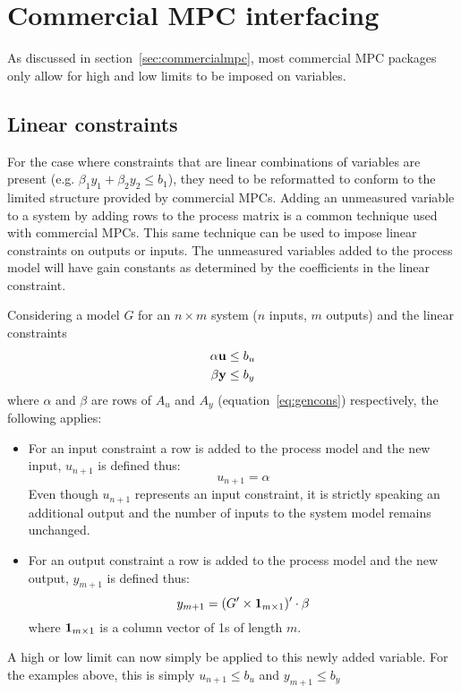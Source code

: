 \section{Commercial MPC interfacing}
As discussed in section~\ref{sec:commercialmpc}, most commercial MPC packages only allow for high and low limits to be imposed on variables.

\subsection{Linear constraints}\label{sec:lincons}
For the case where constraints that are linear combinations of variables are present (e.g. $\beta_1 y_1+\beta_2 y_2\leq b_1$), they need to be reformatted to conform to the limited structure provided by commercial MPCs.
Adding an unmeasured variable to a system by adding rows to the process matrix is a common technique used with commercial MPCs.
This same technique can be used to impose linear constraints  on outputs or inputs.
The unmeasured variables added to the process model will have gain constants as determined by the coefficients in the linear constraint.

Considering a model $G$ for an $n\times m$ system ($n$ inputs, $m$ outputs) and the linear constraints 
\begin{align}
  \alpha {\bf {u}} &\leq b_u\notag\\ 
  \beta {\bf {y}} &\leq b_y \notag   
\end{align}
where $\alpha$ and $\beta$ are rows of $A_u$ and $A_y$ (equation~\ref{eq:gencons}) respectively, the following applies:
\begin{itemize}
\item For an input constraint a row is added to the process model and the new input, $u_{n+1}$ is defined thus:
\begin{equation}
  \label{eq:linconinput}
   u_{n+1} = \alpha
\end{equation}
Even though $u_{n+1}$ represents an input constraint, it is strictly speaking an additional output and the number of inputs to the system model remains unchanged. 
\item For an output constraint a row is added to the process model and the new output, $y_{m+1}$ is defined thus:
\begin{equation}
  \label{eq:linconoutput}
   y_{m+1} = (G'\times{\bf {1}}_{m\times 1})'\cdot\beta
\end{equation}
where ${\bf {1}}_{m\times 1}$ is a column vector of 1s of length $m$.
\end{itemize}
A high or low limit can now simply be applied to this newly added variable.
For the examples above, this is simply $u_{n+1}\leq b_u$ and $y_{m+1}\leq b_y$


